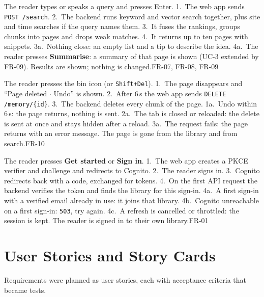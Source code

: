 %
{The reader types or speaks a query and presses Enter.}%
{1.~The web app sends \texttt{POST /search}. 2.~The backend runs keyword and vector search together, plus site and time searches if the query names them. 3.~It fuses the rankings, groups chunks into pages and drops weak matches. 4.~It returns up to ten pages with snippets.}%
{3a.~Nothing close: an empty list and a tip to describe the idea. 4a.~The reader presses \textbf{Summarise}: a summary of that page is shown (UC-3 extended by FR-09).}%
{Results are shown; nothing is changed.}{FR-07, FR-08, FR-09}

%
{The reader presses the bin icon (or \texttt{Shift+Del}).}%
{1.~The page disappears and ``Page deleted $\cdot$ Undo'' is shown. 2.~After 6\,s the web app sends \texttt{DELETE /memory/\{id\}}. 3.~The backend deletes every chunk of the page.}%
{1a.~Undo within 6\,s: the page returns, nothing is sent. 2a.~The tab is closed or reloaded: the delete is sent at once and stays hidden after a reload. 3a.~The request fails: the page returns with an error message.}%
{The page is gone from the library and from search.}{FR-10}

%
{The reader presses \textbf{Get started} or \textbf{Sign in}.}%
{1.~The web app creates a PKCE verifier and challenge and redirects to Cognito. 2.~The reader signs in. 3.~Cognito redirects back with a code, exchanged for tokens. 4.~On the first API request the backend verifies the token and finds the library for this sign-in.}%
{4a.~A first sign-in with a verified email already in use: it joins that library. 4b.~Cognito unreachable on a first sign-in: \texttt{503}, try again. 4c.~A refresh is cancelled or throttled: the session is kept.}%
{The reader is signed in to their own library.}{FR-01}

\section{User Stories and Story Cards}

Requirements were planned as user stories, each with acceptance criteria
that became tests.

